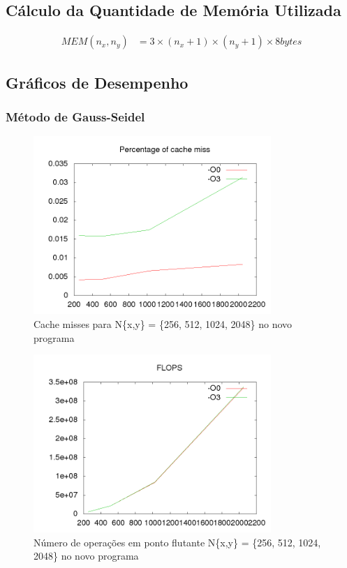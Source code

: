 \documentclass[12pt]{article}
\begin{document}
	\subsection{Cálculo da Quantidade de Memória Utilizada}
		\begin{align*}
			MEM(n_x,n_y) &= 3\times(n_x+1)\times(n_y+1)\times 8bytes
		\end{align*}

	\newpage
	\subsection{Gráficos de Desempenho}
		\subsubsection{Método de Gauss-Seidel}
		\begin{figure}[ht!]
			\centering
			\includegraphics[width=90mm]{new_gs_cache.png}
			\caption{Cache misses para N\{x,y\} = \{256, 512, 1024, 2048\} no novo programa}
		\end{figure}
		
		\begin{figure}[ht!]
			\centering
			\includegraphics[width=90mm]{new_gs_flops.png}
			\caption{Número de operações em ponto flutante N\{x,y\} = \{256, 512, 1024, 2048\} no novo programa}
		\end{figure}
		
\end{document}
